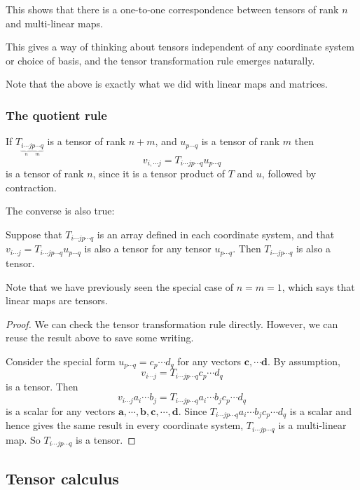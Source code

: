 \documentclass[a4paper]{article}
\begin{document}
This shows that there is a one-to-one correspondence between tensors of rank $n$ and multi-linear maps.

This gives a way of thinking about tensors independent of any coordinate system or choice of basis, and the tensor transformation rule emerges naturally.

Note that the above is exactly what we did with linear maps and matrices.
\subsubsection*{The quotient rule}
If $T_{\underbrace{i\cdots j}_n\underbrace{p\cdots q}_m}$ is a tensor of rank $n+ m$, and $u_{p\cdots q}$ is a tensor of rank $m$ then
\[
  v_{i, \cdots j}= T_{i\cdots j p\cdots q}u_{p\cdots q}
\]
is a tensor of rank $n$, since it is a tensor product of $T$ and $u$, followed by contraction.

The converse is also true:
\begin{prop}
  Suppose that $T_{i\cdots jp\cdots q}$ is an array defined in each coordinate system, and that $v_{i\cdots j} = T_{i\cdots jp\cdots q} u_{p\cdots q}$ is also a tensor for any tensor $u_{p \cdots q}$. Then $T_{i\cdots j p\cdots q}$ is also a tensor.
\end{prop}

Note that we have previously seen the special case of $n = m = 1$, which says that linear maps are tensors.
\begin{proof}
  We can check the tensor transformation rule directly. However, we can reuse the result above to save some writing.

  Consider the special form $u_{p \cdots q} = c_p \cdots d_q$ for any vectors $\mathbf{c}, \cdots \mathbf{d}$. By assumption,
  \[
    v_{i\cdots j} = T_{i\cdots jp\cdots q}c_p\cdots d_q
  \]
  is a tensor. Then
  \[
    v_{i\cdots j}a_i \cdots b_j = T_{i\cdots jp\cdots q}a_i\cdots b_jc_p\cdots d_q
  \]
  is a scalar for any vectors $\mathbf{a}, \cdots, \mathbf{b}, \mathbf{c},\cdots, \mathbf{d}$. Since $T_{i\cdots jp\cdots q}a_i\cdots b_jc_p\cdots d_q$ is a scalar and hence gives the same result in every coordinate system, $T_{i\cdots jp\cdots q}$ is a multi-linear map. So $T_{i\cdots jp\cdots q}$ is a tensor.
\end{proof}


\subsection{Tensor calculus}
\end{document}
